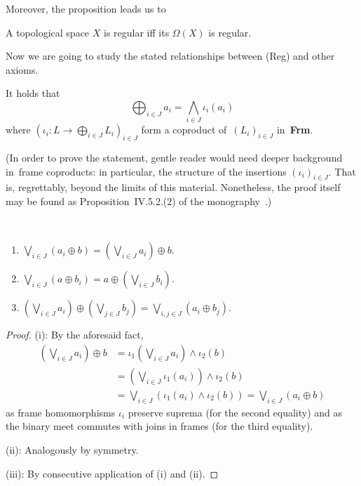 Moreover, the proposition leads us to
\begin{cor}
  A topological space $X$ is regular iff its $\Omega(X)$ is regular.
\end{cor}

Now we are going to study the stated relationships between (Reg) and other
axioms.

\begin{fact}
  It holds that
  \[
    \bigoplus_{i\in J} a_i = \bigwedge_{i\in J} \iota_i(a_i)
  \]
  where $(\iota_i\colon L \to \bigoplus_{i\in J} L_i)_{i\in J}$ form a
  coproduct of~$(L_i)_{i\in J}$ in~{\bf Frm}.
\end{fact}
(In order to prove the statement, gentle reader would need deeper background
in~frame coproducts:
in particular, the structure of the insertions $(\iota_i)_{i\in J}$.
That is, regrettably, beyond the limits of this material.
Nonetheless, the proof itself may be found as Proposition~IV.5.2.(2) of the
monography~\cite{picado-pultr12}.)

\begin{lem} \label{oplus-vee-distrib}
  ~
  \begin{enumerate}
  \item $\bigvee_{i\in J} \left(a_i \oplus b\right) = \left(\bigvee_{i\in J}
    a_i \right) \oplus b$.
  \item $\bigvee_{i\in J} \left(a \oplus b_i\right) = a \oplus
    \left(\bigvee_{i\in J} b_i \right)$.
  \item $\left(\bigvee_{i\in J} a_i\right) \oplus \left(\bigvee_{j\in J}
    b_j\right) = \bigvee_{i, j\in J} \left(a_i \oplus b_j\right)$.
  \end{enumerate}
\end{lem}
\begin{proof}
  (i):
  By the aforesaid fact,
  \begin{align*}
    \left(\bigvee_{i\in J} a_i \right) \oplus b
    &= \iota_1\left(\bigvee_{i\in J} a_i \right) \wedge \iota_2(b) \\
    &= \left(\bigvee_{i\in J} \iota_1(a_i) \right) \wedge \iota_2(b) \\
    &= \bigvee_{i\in J} \left(\iota_1(a_i) \wedge \iota_2(b) \right)
    = \bigvee_{i\in J} \left(a_i \oplus b\right)
  \end{align*}
  as frame homomorphisms $\iota_i$ preserve suprema (for the second equality)
  and as the binary meet commutes with joins in frames (for the third
  equality).

  (ii):
  Analogously by symmetry.

  (iii):
  By consecutive application of (i) and (ii).
\end{proof}

